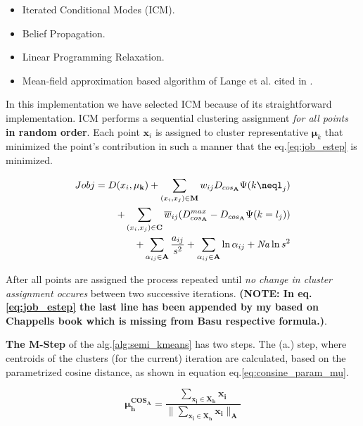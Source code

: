 \documentclass[dvips,dvipdfm,pdftex]{llncs}
\begin{document}
\begin{itemize}
	\item Iterated Conditional Modes (ICM).
	\item Belief Propagation.
	\item Linear Programming Relaxation.
	\item Mean-field approximation based algorithm of Lange et al. cited in \cite{chapelle2006semi_hmrf_kmeans}.
\end{itemize}

In this implementation we have selected ICM because of its straightforward implementation. ICM performs a sequential clustering assignment \emph{for all points} \textbf{in random order}. Each point $\mathbf{x}_{i}$ is assigned to cluster representative $\mathbf{\mu}_{k}$ that minimized the point's contribution in such a manner that the eq.\ref{eq:job_estep} is minimized.

\begin{equation}
	\begin{split}
		Jobj=D(x_{i},\mathbf{\mu}_{\mathbf{k}})+\sum_{(x_{i},x_{j})\in\mathbf{M}}w_{ij}D_{cos_{\mathbf{A}}}\Psi(k\neql_{j})\\
		+\sum_{(x_{i},x_{j})\in\mathbf{C}}\overline{w}_{ij}(D_{cos_{\mathbf{A}}}^{max}-D_{cos_{\mathbf{A}}}\Psi(k=l_{j}))\\
		+\sum_{\alpha_{ij}\in\mathbf{A}}\frac{a_{ij}}{s^{2}}+\sum_{\alpha_{ij}\in\mathbf{A}}\ln\alpha_{ij}+\mathit{Na}\ln s^{2}
	\end{split}
\label{eq:job_estep}
\end{equation}

After all points are assigned the process repeated until \emph{no change in cluster assignment occures} between two successive iterations. \textbf{(NOTE: In eq.\ref{eq:job_estep} the last line has been appended by my based on Chappells book which is missing from Basu respective formula.)}.

\textbf{The M-Step} of the alg.\ref{alg:semi_kmeans} has two steps. The (a.) step, where centroids of the clusters (for the current) iteration are calculated, based on the parametrized cosine distance, as shown in equation eq.\ref{eq:consine_param_mu}.

\begin{equation}
	\mathbf{\mu_{h}^{COS{}_{\mathbf{A}}}=\frac{\sum_{x_{i}\in\mathbf{\mathbf{X}_{h}}}x_{i}}{\parallel\sum_{\mathbf{x}_{i}\in\mathbf{X}_{h}}\mathbf{x}_{i}\parallel_{\mathbf{A}}}}
\label{eq:consine_param_mu}
\end{equation}
\end{document}

